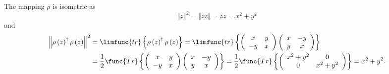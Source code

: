 \documentclass[aps,preprint]{revtex4}
\begin{document}
The mapping $\rho $ is isometric as 
\begin{equation}
\left\Vert z\right\Vert ^{2}=\left\Vert \overline{z}z\right\Vert =\overline{z%
}z=x^{2}+y^{2}
\end{equation}%
and 
\begin{align}
\left\Vert \rho \left( z\right) ^{\dagger }\rho \left( z\right) \right\Vert
^{2}& =\limfunc{tr}\left\{ \rho \left( z\right) ^{\dagger }\rho \left(
z\right) \right\} =\limfunc{tr}\left\{ \left( 
\begin{array}{cc}
x & y \\ 
-y & x%
\end{array}%
\right) \left( 
\begin{array}{cc}
x & -y \\ 
y & x%
\end{array}%
\right) \right\} \\
& =\frac{1}{2}\func{Tr}\left\{ \left( 
\begin{array}{cc}
x & y \\ 
-y & x%
\end{array}%
\right) \left( 
\begin{array}{cc}
x & -y \\ 
y & x%
\end{array}%
\right) \right\} =\frac{1}{2}\func{Tr}\left\{ \left( 
\begin{array}{cc}
x^{2}+y^{2} & 0 \\ 
0 & x^{2}+y^{2}%
\end{array}%
\right) \right\} =x^{2}+y^{2}.
\end{align}
\end{document}
